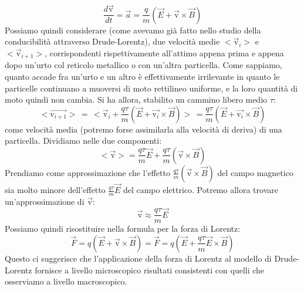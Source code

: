\documentclass[a4paper,12pt]{article}
\begin{document}
$$ \frac{d\vec{\mathrm{v}}}{dt} = \vec{a} = \frac{q}{m}(\vec{E} + \vec{\mathrm{v}} \times \vec{B}) $$
Possiamo quindi considerare (come avevamo già fatto nello studio della conducibilità attraverso Drude-Lorentz), due velocità medie
$<\vec{\mathrm{v}}_i>$ e $<\vec{\mathrm{v}}_{i + 1}>$, corrispondenti rispettivamente all'attimo appena prima e appena dopo un'urto
col reticolo metallico o con un'altra particella. Come sappiamo, quanto accade fra un'urto e un altro è effettivamente irrilevante
in quanto le particelle continuano a muoversi di moto rettilineo uniforme, e la loro quantità di moto quindi non cambia. Si ha allora,
stabilito un cammino libero medio $\tau$:
$$ <\vec{\mathrm{v}_{i + 1}}>\, =\, < \vec{\mathrm{v}}_i + \frac{q\tau}{m}(\vec{E} + \vec{\mathrm{v}_i} \times \vec{B}) > \, =  \frac{q\tau}{m}(\vec{E} + \vec{\mathrm{v}_i} \times \vec{B}) $$
come velocità media (potremo forse assimilarla alla velocità di deriva) di una particella. Dividiamo nelle due componenti:
$$ < \vec{\mathrm{v}} > = \frac{q\tau}{m}\vec{E} + \frac{q\tau}{m}(\vec{\mathrm{v}} \times \vec{B}) $$
Prendiamo come approssimazione che l'effetto $ \frac{q\tau}{m}(\vec{\mathrm{v}} \times \vec{B}) $ del campo magnetico
sia molto minore dell'effetto $ \frac{q\tau}{m}\vec{E} $ del campo elettrico. Potremo allora trovare un'approssimazione di $\vec{\mathrm{v}}$:
$$ \vec{\mathrm{v}} \approx   \frac{q\tau}{m}\vec{E} $$
Possiamo quindi risostituire nella formula per la forza di Lorentz:
$$ \vec{F} = q(\vec{E} + \vec{\mathrm{v}} \times \vec{B}) =  \vec{F} = q(\vec{E} +  \frac{q\tau}{m}\vec{E} \times \vec{B}) $$
Questo ci suggerisce che l'applicazione della forza di Lorentz al modello di Drude-Lorentz fornisce a livello microscopico risultati
consistenti con quelli che osserviamo a livello macroscopico.
\end{document}
